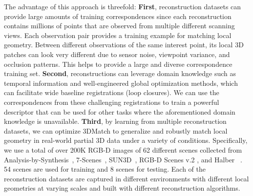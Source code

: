 \documentclass[10pt,twocolumn,letterpaper]{article}
\begin{document}
The advantage of this approach is threefold: {\bf First}, reconstruction datasets can provide large amounts of training correspondences since each reconstruction contains millions of points that are observed from multiple different scanning views. Each observation pair provides a training example for matching local geometry. Between different observations of the same interest point, its local 3D patches can look very different due to sensor noise, viewpoint variance, and occlusion patterns. This helps to provide a large and diverse correspondence training set. 
{\bf  Second}, reconstructions can leverage domain knowledge such as temporal information and well-engineered global optimization methods, which can facilitate wide baseline registrations (loop closures). We can use the correspondences from these challenging registrations to train a powerful descriptor that can be used for other tasks where the aforementioned domain knowledge is unavailable.
{\bf  Third}, by learning from multiple reconstruction datasets, we can optimize 3DMatch to generalize and robustly match local geometry in real-world partial 3D data under a variety of conditions.  Specifically, we use a total of over 200K  RGB-D images of 62 different scenes collected from Analysis-by-Synthesis~\cite{valentin2016learning}, 7-Scenes~\cite{shotton2013scene}, SUN3D~\cite{SUN3D}, RGB-D Scenes v.2 \cite{lai2014unsupervised}, and Halber \etal~\cite{halber2016structured}. 54 scenes are used for training and 8 scenes for testing. Each of the reconstruction datasets are captured in different environments with different local geometries at varying scales and built with different reconstruction algorithms. 
\end{document}
